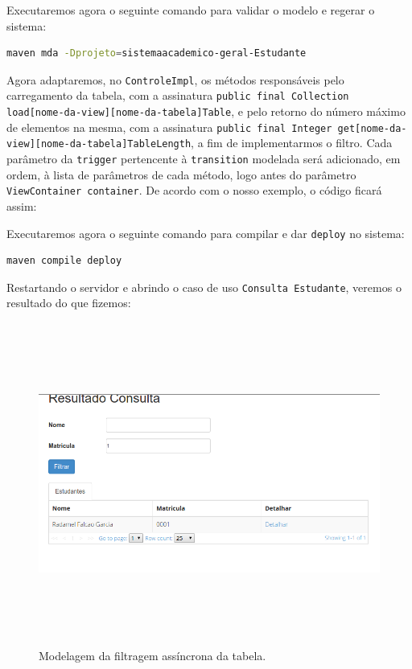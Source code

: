 Executaremos agora o seguinte comando para validar o modelo e regerar o
sistema:
\begin{lstlisting}[language=bash, frame=single, breaklines=true]
maven mda -Dprojeto=sistemaacademico-geral-Estudante
\end{lstlisting}

Agora adaptaremos, no \texttt{ControleImpl}, os métodos responsáveis pelo
carregamento da tabela, com a assinatura \texttt{public final Collection
load[nome-da-view][nome-da-tabela]Table}, e pelo retorno do número máximo de
elementos na mesma, com a assinatura \texttt{public final Integer
get[nome-da-view][nome-da-tabela]TableLength}, a fim de implementarmos o filtro.
Cada parâmetro da \texttt{trigger} pertencente à \texttt{transition} modelada
será adicionado, em ordem, à lista de parâmetros de cada método, logo antes do
parâmetro \texttt{ViewContainer container}. De acordo com o nosso exemplo, o
código ficará assim:


Executaremos agora o seguinte comando para compilar e dar \texttt{deploy} no
sistema:
\begin{lstlisting}[language=bash, frame=single, breaklines=true]
maven compile deploy
\end{lstlisting}

Restartando o servidor e abrindo o caso de uso \texttt{Consulta Estudante},
veremos o resultado do que fizemos:
\begin{figure}[H]
	\centering
	\includegraphics[width=340pt,height=300pt]{files/imgs/tutorial-mdarte-0042.png}
	\caption{Modelagem da filtragem assíncrona da tabela.}
	\label{modelando_filtragem_assincrona}
\end{figure}
